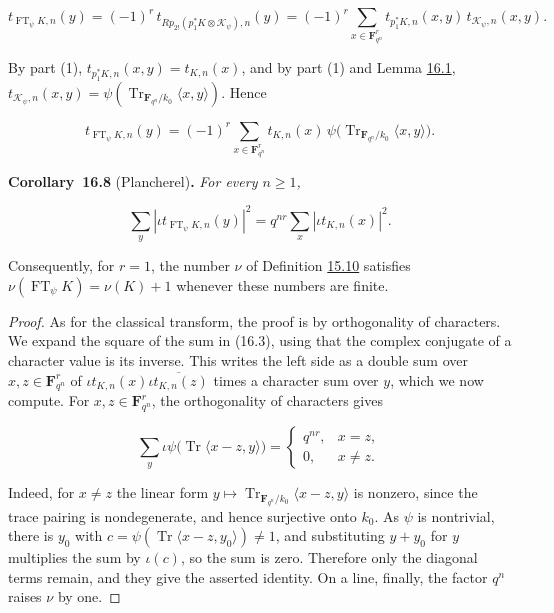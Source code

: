 \documentclass[11pt]{article}
\newenvironment{bpstatement}[2]{\par\addvspace{0.6\baselineskip}\noindent\textbf{#1}#2\textbf{.}\enspace\ignorespaces}
  {\par\addvspace{0.4\baselineskip}}
\newenvironment{bpstatementit}[2]{\begin{bpstatement}{#1}{#2}\itshape\ignorespaces}{\end{bpstatement}}
\begin{document}
\[
t_{\operatorname{FT}_\psi K,n}(y)
=(-1)^r\,t_{Rp_{2!}(p_1^*K\otimes\mathcal K_\psi),n}(y)
=(-1)^r\sum_{x\in\mathbf F_{q^n}^r}t_{p_1^*K,n}(x,y)\,
t_{\mathcal K_\psi,n}(x,y).
\]

By part (1), \(t_{p_1^*K,n}(x,y)=t_{K,n}(x)\), and by part (1) and Lemma \hyperref[bp171]{16.1}, \(t_{\mathcal K_\psi,n}(x,y)=\psi(\operatorname{Tr}_{\mathbf F_{q^n}/k_0}\langle x,y\rangle)\). Hence

\[
t_{\operatorname{FT}_\psi K,n}(y)
=(-1)^r\sum_{x\in\mathbf F_{q^n}^r}
t_{K,n}(x)\,
\psi\bigl(\operatorname{Tr}_{\mathbf F_{q^n}/k_0}
\langle x,y\rangle\bigr).
\tag{16.3}
\]

\label{bp192}%
\begin{bpstatementit}{Corollary~16.8}{ (Plancherel)}
For every \(n\ge1\),

\[
\sum_y|\iota t_{\operatorname{FT}_\psi K,n}(y)|^2
=q^{nr}\sum_x|\iota t_{K,n}(x)|^2.
\]

Consequently, for \(r=1\), the number \(\nu\) of Definition \hyperref[bp151]{15.10} satisfies \(\nu(\operatorname{FT}_\psi K)=\nu(K)+1\) whenever these numbers are finite.
\end{bpstatementit}

\begin{proof}[{Proof}]\label{bp193}%
As for the classical transform, the proof is by orthogonality of characters. We expand the square of the sum in (16.3), using that the complex conjugate of a character value is its inverse. This writes the left side as a double sum over \(x,z\in\mathbf F_{q^n}^r\) of \(\iota t_{K,n}(x)\overline{\iota t_{K,n}(z)}\) times a character sum over \(y\), which we now compute. For \(x,z\in\mathbf F_{q^n}^r\), the orthogonality of characters gives

\[
\sum_y\iota\psi\bigl(\operatorname{Tr}\langle x-z,y\rangle\bigr)
=\begin{cases}q^{nr},&x=z,\\0,&x\ne z.\end{cases}
\]

Indeed, for \(x\ne z\) the linear form \(y\mapsto\operatorname{Tr}_{\mathbf F_{q^n}/k_0}\langle x-z,y\rangle\) is nonzero, since the trace pairing is nondegenerate, and hence surjective onto \(k_0\). As \(\psi\) is nontrivial, there is \(y_0\) with \(c=\psi(\operatorname{Tr}\langle x-z,y_0\rangle)\ne1\), and substituting \(y+y_0\) for \(y\) multiplies the sum by \(\iota(c)\), so the sum is zero. Therefore only the diagonal terms remain, and they give the asserted identity. On a line, finally, the factor \(q^n\) raises \(\nu\) by one.
\end{proof}
\end{document}
